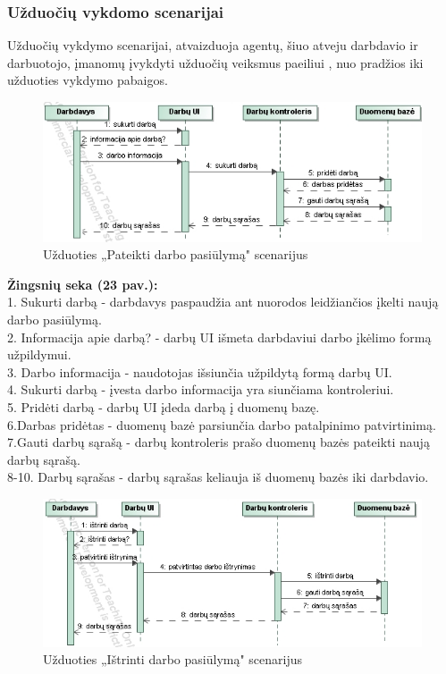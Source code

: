 \documentclass{VUMIFPSkursinis}
\begin{document}
\subsubsection{Užduočių vykdomo scenarijai}
Užduočių vykdymo scenarijai, atvaizduoja agentų, šiuo atveju darbdavio ir darbuotojo, įmanomų įvykdyti užduočių veiksmus paeiliui , nuo pradžios iki užduoties vykdymo pabaigos.
%
\begin{figure}[H]
\centering
\includegraphics[scale=0.9, frame]{img/seku(pridetidarba).png}
\caption{Užduoties „Pateikti darbo pasiūlymą" scenarijus}
\end{figure}
	\textbf{Žingsnių seka (23 pav.):}\\
	1. Sukurti darbą - darbdavys paspaudžia ant nuorodos leidžiančios įkelti naują darbo pasiūlymą. \\
	2. Informacija apie darbą? - darbų UI išmeta darbdaviui darbo įkėlimo formą užpildymui. \\
	3. Darbo informacija - naudotojas išsiunčia užpildytą formą darbų UI. \\
	4. Sukurti darbą - įvesta darbo informacija yra siunčiama kontroleriui. \\
	5. Pridėti darbą - darbų UI įdeda darbą į duomenų bazę. \\
	6.Darbas pridėtas - duomenų bazė parsiunčia darbo patalpinimo patvirtinimą.\\
	7.Gauti darbų sąrašą - darbų kontroleris prašo duomenų bazės pateikti naują darbų sąrašą.\\
	8-10. Darbų sąrašas - darbų sąrašas keliauja iš duomenų bazės iki darbdavio. 
%
\begin{figure}[H]
\centering
\includegraphics[width=\linewidth, frame]{img/seku(istrintidarba).png}
\caption{Užduoties „Ištrinti darbo pasiūlymą" scenarijus}
\end{figure}
\end{document}
